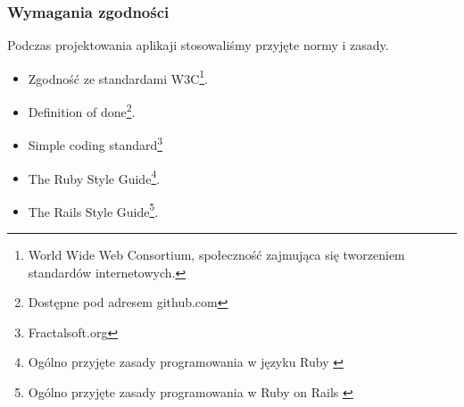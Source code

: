   \subsubsection{Wymagania zgodności}
    Podczas projektowania aplikaji stosowaliśmy przyjęte normy i zasady.
    \begin{itemize}
      \item Zgodność ze standardami W3C\footnote{World Wide Web Consortium, społeczność zajmująca się tworzeniem standardów internetowych.}.
      \item Definition of done\footnote{Dostępne pod adresem github.com}.
      \item Simple coding standard\footnote{Fractalsoft.org}
      \item The Ruby Style Guide\footnote{Ogólno przyjęte zasady programowania w języku Ruby \cite{ruby_style_guide}}.
      \item The Rails Style Guide\footnote{Ogólno przyjęte zasady programowania w Ruby on Rails \cite{rails_style_guide}}.
    \end{itemize}
